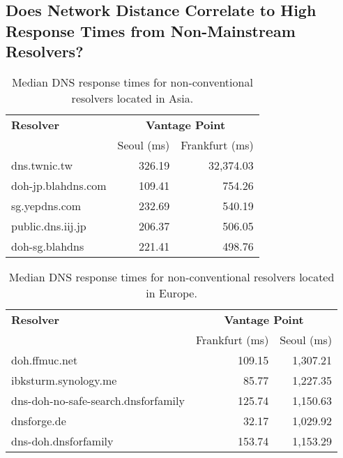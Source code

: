\subsection{Does Network Distance Correlate to High Response Times from Non-Mainstream Resolvers?}
\begin{table}[t!]
\centering
\begin{tabular}{l|rr}
\toprule
    \textbf{Resolver} & \multicolumn{2}{c}{\textbf{Vantage Point}} \\
                  & \textrm{Seoul (ms)}         & \textrm{Frankfurt (ms)} \\
\midrule
dns.twnic.tw                                & 326.19 & 32,374.03                            \\
doh-jp.blahdns.com                          & 109.41                                           & 754.26                              \\
sg.yepdns.com                               & 232.69                                           & 540.19                              \\
public.dns.iij.jp                           & 206.37                                           & 506.05                              \\
doh-sg.blahdns                              & 221.41                                           & 498.76                              \\
\bottomrule
\end{tabular}
\caption{Median DNS response times for non-conventional resolvers located in Asia.}
\label{tab:UnconvAsia}
\end{table}

\begin{table}[t!]
\centering
\begin{tabular}{l|rr}
\toprule
\textbf{Resolver} & \multicolumn{2}{c}{\textbf{Vantage Point}} \\
                  & \textrm{Frankfurt (ms)}     & \textrm{Seoul (ms)} \\
\midrule
doh.ffmuc.net                               & 109.15 & 1,307.21                         \\
ibksturm.synology.me                        & 85.77 & 1,227.35                         \\
dns-doh-no-safe-search.dnsforfamily         & 125.74 & 1,150.63                         \\
dnsforge.de                                 & 32.17 & 1,029.92                         \\
dns-doh.dnsforfamily                        & 153.74 & 1,153.29                         \\
\bottomrule
\end{tabular}
\caption{Median DNS response times for non-conventional resolvers located in Europe.}
\label{tab:UnconvEur}
\end{table}

